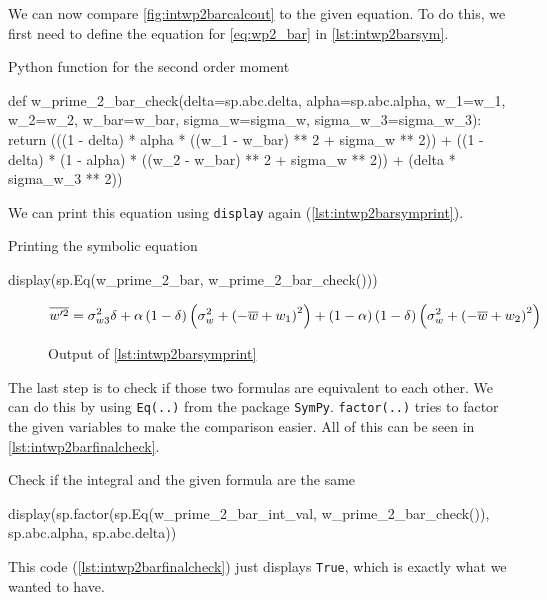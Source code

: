 We can now compare \cref{fig:intwp2barcalcout} to the given equation.
To do this, we first need to define the equation for \cref{eq:wp2_bar} in \cref{lst:intwp2barsym}.
\begin{listing}[!ht]
    \caption{Python function for the second order moment}
    \label{lst:intwp2barsym}
    \begin{pythoncode}
        def w_prime_2_bar_check(delta=sp.abc.delta, alpha=sp.abc.alpha, w_1=w_1, w_2=w_2, w_bar=w_bar, sigma_w=sigma_w, sigma_w_3=sigma_w_3):
            return (((1 - delta) * alpha * ((w_1 - w_bar) ** 2 + sigma_w ** 2))
                + ((1 - delta) * (1 - alpha) * ((w_2 - w_bar) ** 2 + sigma_w ** 2))
                + (delta * sigma_w_3 ** 2))
    \end{pythoncode}
\end{listing}
We can print this equation using \texttt{display} again (\cref{lst:intwp2barsymprint}).
\begin{listing}[!ht]
    \caption{Printing the symbolic equation}
    \label{lst:intwp2barsymprint}
    \begin{pythoncode}
        display(sp.Eq(w_prime_2_bar, w_prime_2_bar_check()))
    \end{pythoncode}
\end{listing}
\begin{figure}[!ht]
    \centering
    \caption{Output of \cref{lst:intwp2barsymprint}}
    \label{fig:intwp2barsymprintout}
    \begin{align}
        \nonumber
        \overline{w'^2}
        = \sigma_{w3}^{2} \delta + \alpha \left(1 - \delta\right)
        \left(\sigma_{w}^{2} + \left(- \overline{w} + w_{1}\right)^{2}\right) +
        \left(1 -\alpha\right) \left(1 - \delta\right) \left(\sigma_{w}^{2} +
        \left(- \overline{w} + w_{2}\right)^{2}\right)
    \end{align}
\end{figure}
The last step is to check if those two formulas are equivalent to each other.
We can do this by using \texttt{Eq(..)} from the package \texttt{SymPy}.
\texttt{factor(..)} tries to factor the given variables to make the comparison easier.
All of this can be seen in \cref{lst:intwp2barfinalcheck}.
\begin{listing}[!ht]
    \caption{Check if the integral and the given formula are the same}
    \label{lst:intwp2barfinalcheck}
    \begin{pythoncode}
        display(sp.factor(sp.Eq(w_prime_2_bar_int_val, w_prime_2_bar_check()), sp.abc.alpha, sp.abc.delta))
    \end{pythoncode}
\end{listing}
This code (\cref{lst:intwp2barfinalcheck}) just displays \texttt{True},
which is exactly what we wanted to have.

